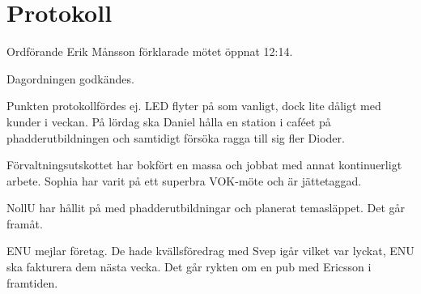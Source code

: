 \documentclass[10pt]{article}
\def\mo{Erik Månsson}
\begin{document}
\section*{Protokoll}
\begin{paragrafer}
Ordförande {\mo} förklarade mötet öppnat 12:14.

{\valavmo}

{\valavms}

{\valavj}

{\tosg}

{\ingaadj}


Dagordningen godkändes.


\begin{fyllnadsval} %
\end{fyllnadsval}
\begin{paragrafer}
Punkten protokollfördes ej.
LED flyter på som vanligt, dock lite dåligt med kunder i veckan. På lördag ska Daniel hålla en station i caféet på phadderutbildningen och samtidigt försöka ragga till sig fler Dioder.

Förvaltningsutskottet har bokfört en massa och jobbat med annat kontinuerligt arbete. Sophia har varit på ett superbra VOK-möte och är jättetaggad.

NollU har hållit på med phadderutbildningar och planerat temasläppet. Det går framåt.

ENU mejlar företag. De hade kvällsföredrag med Svep igår vilket var lyckat, ENU ska fakturera dem nästa vecka. Det går rykten om en pub med Ericsson i framtiden.


\end{paragrafer}
\end{paragrafer}
\end{document}
